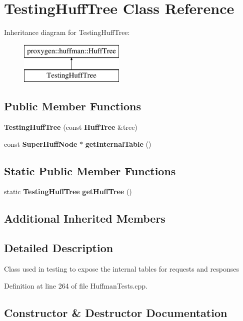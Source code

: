 \section{Testing\+Huff\+Tree Class Reference}
\label{classTestingHuffTree}
Inheritance diagram for Testing\+Huff\+Tree\+:\begin{figure}[H]
\begin{center}
\leavevmode
\includegraphics[height=2.000000cm]{classTestingHuffTree}
\end{center}
\end{figure}
\subsection*{Public Member Functions}
\begin{DoxyCompactItemize}
\item 
{\bf Testing\+Huff\+Tree} (const {\bf Huff\+Tree} \&tree)
\item 
const {\bf Super\+Huff\+Node} $\ast$ {\bf get\+Internal\+Table} ()
\end{DoxyCompactItemize}
\subsection*{Static Public Member Functions}
\begin{DoxyCompactItemize}
\item 
static {\bf Testing\+Huff\+Tree} {\bf get\+Huff\+Tree} ()
\end{DoxyCompactItemize}
\subsection*{Additional Inherited Members}


\subsection{Detailed Description}
Class used in testing to expose the internal tables for requests and responses 

Definition at line 264 of file Huffman\+Tests.\+cpp.



\subsection{Constructor \& Destructor Documentation}
